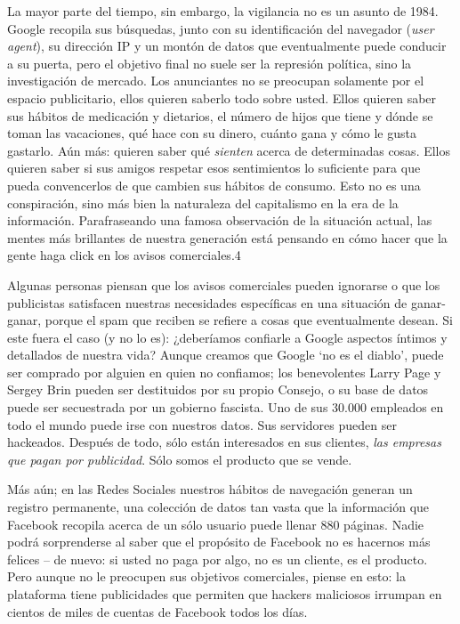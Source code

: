 \documentclass[10pt,a5paper,twoside,,]{book}
\begin{document}
La mayor parte del tiempo, sin embargo, la vigilancia no es un asunto de
1984. Google recopila sus búsquedas, junto con su identificación del
navegador (\emph{user agent}), su dirección IP y un montón de datos que
eventualmente puede conducir a su puerta, pero el objetivo final no
suele ser la represión política, sino la investigación de mercado. Los
anunciantes no se preocupan solamente por el espacio publicitario, ellos
quieren saberlo todo sobre usted. Ellos quieren saber sus hábitos de
medicación y dietarios, el número de hijos que tiene y dónde se toman
las vacaciones, qué hace con su dinero, cuánto gana y cómo le gusta
gastarlo. Aún más: quieren saber qué \emph{sienten} acerca de
determinadas cosas. Ellos quieren saber si sus amigos respetar esos
sentimientos lo suficiente para que pueda convencerlos de que cambien
sus hábitos de consumo. Esto no es una conspiración, sino más bien la
naturaleza del capitalismo en la era de la información. Parafraseando
una famosa observación de la situación actual, las mentes más brillantes
de nuestra generación está pensando en cómo hacer que la gente haga
click en los avisos comerciales.4

Algunas personas piensan que los avisos comerciales pueden ignorarse o
que los publicistas satisfacen nuestras necesidades específicas en una
situación de ganar-ganar, porque el spam que reciben se refiere a cosas
que eventualmente desean. Si este fuera el caso (y no lo es):
¿deberíamos confiarle a Google aspectos íntimos y detallados de nuestra
vida? Aunque creamos que Google `no es el diablo', puede ser comprado
por alguien en quien no confiamos; los benevolentes Larry Page y Sergey
Brin pueden ser destituidos por su propio Consejo, o su base de datos
puede ser secuestrada por un gobierno fascista. Uno de sus 30.000
empleados en todo el mundo puede irse con nuestros datos. Sus servidores
pueden ser hackeados. Después de todo, sólo están interesados en sus
clientes, \emph{las empresas que pagan por publicidad}. Sólo somos el
producto que se vende.

Más aún; en las Redes Sociales nuestros hábitos de navegación generan un
registro permanente, una colección de datos tan vasta que la información
que Facebook recopila acerca de un sólo usuario puede llenar 880
páginas. Nadie podrá sorprenderse al saber que el propósito de Facebook
no es hacernos más felices -- de nuevo: si usted no paga por algo, no es
un cliente, es el producto. Pero aunque no le preocupen sus objetivos
comerciales, piense en esto: la plataforma tiene publicidades que
permiten que hackers maliciosos irrumpan en cientos de miles de cuentas
de Facebook todos los días.
\end{document}
